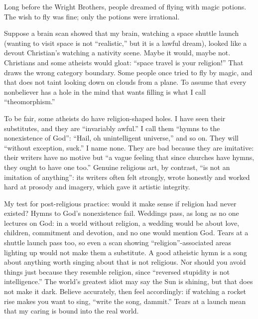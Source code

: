 
Long before the Wright Brothers, people dreamed of flying with magic potions. The wish to fly was fine; only the potions were irrational.

Suppose a brain scan showed that my brain, watching a space shuttle launch (wanting to visit space is not ``realistic,'' but it is a lawful dream), looked like a devout Christian's watching a nativity scene. Maybe it would, maybe not. Christians and some atheists would gloat: ``space travel is your religion!'' That draws the wrong category boundary. Some people once tried to fly by magic, and that does not taint looking down on clouds from a plane. To assume that every nonbeliever has a hole in the mind that wants filling is what I call ``theomorphism.''

To be fair, some atheists do have religion-shaped holes. I have seen their substitutes, and they are ``invariably awful.'' I call them ``hymns to the nonexistence of God'': ``Hail, oh unintelligent universe,'' and so on. They will ``without exception, suck.'' I name none. They are bad because they are imitative: their writers have no motive but ``a vague feeling that since churches have hymns, they ought to have one too.'' Genuine religious art, by contrast, ``is not an imitation of anything'': its writers often felt strongly, wrote honestly and worked hard at prosody and imagery, which gave it artistic integrity. 

My test for post-religious practice: would it make sense if religion had never existed? Hymns to God's nonexistence fail. Weddings pass, as long as no one lectures on God: in a world without religion, a wedding would be about love, children, commitment and devotion, and no one would mention God.  Tears at a shuttle launch pass too, so even a scan showing ``religion''-associated areas lighting up would not make them a substitute. A good atheistic hymn is a song about anything worth singing about that is not religious. Nor should you avoid things just because they resemble religion, since ``reversed stupidity is not intelligence.'' The world's greatest idiot may say the Sun is shining, but that does not make it dark. Believe accurately, then feel accordingly: if watching a rocket rise makes you want to sing, ``write the song, dammit.'' Tears at a launch mean that my caring is bound into the real world.

